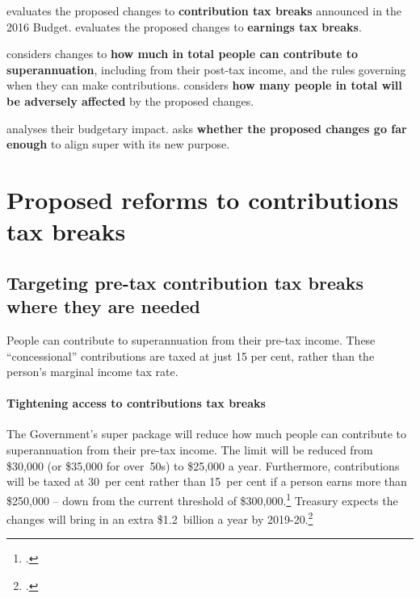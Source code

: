 \documentclass[continuous]{grattan}\usepackage[]{graphicx}\usepackage[]{color}
\begin{document}
 evaluates the proposed changes to \textbf{contribution tax breaks} announced in the 2016 Budget.
 evaluates the proposed changes to \textbf{earnings tax breaks}.

 considers changes to \textbf{how much in total people can contribute to superannuation}, including from their post-tax income, and the rules governing when they can make contributions.
 considers \textbf{how many people in total will be adversely affected} by the proposed changes.

 analyses their budgetary impact. 
 asks \textbf{whether the proposed changes go far enough} to align super with its new purpose. 











\chapter{{Proposed reforms to contributions tax breaks}}\label{chap:proposed-reforms-to-contributions-tax-breaks}
\section{Targeting pre-tax contribution tax breaks where they are needed}\label{sec:targeting-pre-tax-contribution-tax-breaks-where-they-are-needed}
People can contribute to superannuation from their pre-tax income. 
These “concessional” contributions are taxed at just 15 per cent, rather than the person’s marginal income tax rate.

\subsubsection{Tightening access to contributions tax breaks}\label{subsubsec:tightening-access-to-contributions-tax-breaks}
The Government’s super package will reduce how much people can contribute to superannuation from their pre-tax income.  
The limit will be reduced from \$30,000 (or \$35,000 for over~50s) to \$25,000 a year. 
Furthermore, contributions will be taxed at 30~per cent rather than 15~per cent if a person earns more than \$250,000 – down from the current threshold of \$300,000.\footcite{ATO2016Div293-Info-for-individuals} %
Treasury expects the changes will bring in an extra \$1.2~billion a year by 2019-20.\footcite[][28]{BudgetPapers201617} 
\end{document}
